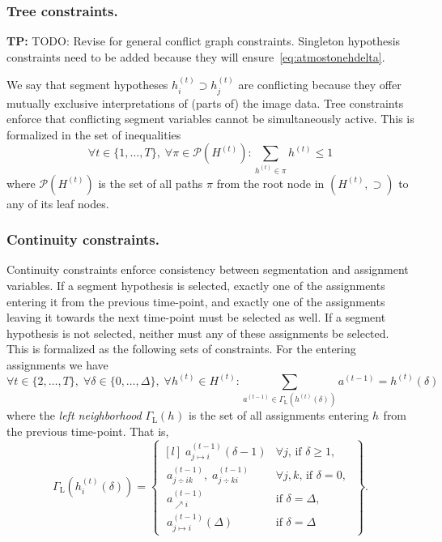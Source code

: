 \documentclass[a4paper]{article}
\newcommand{\TP}[1]{{\color{Red}\sc \textbf{TP:} #1}{}}
\newcommand{\set}[1]{\ensuremath{\{#1\}}}
\newcommand{\hypset}[1]{\ensuremath{H^{(#1)}}\xspace}
\newcommand{\Hypt}{\hypset{t}}
\newcommand{\hypti}[2][t]{\ensuremath{h^{(#1)}_{#2}}\xspace}
\newcommand{\vhset}[1]{\hypset{#1}}
\newcommand{\Ht}[1][t]{\vhset{#1}}
\newcommand{\vh}[1][]{\ensuremath{h_{#1}}\xspace}
\newcommand{\vht}[1][t]{\ensuremath{h^{(#1)}}\xspace}
\newcommand{\vhtd}[2][t]{\ensuremath{h^{(#1)}\left({#2}\right)}\xspace}
\newcommand{\vhtid}[3][t]{\ensuremath{h^{(#1)}_{#2}\left({#3}\right)}\xspace}
\newcommand{\Paths}[1]{\ensuremath{\mathcal{P}(#1)}\xspace}
\newcommand{\Path}{\ensuremath{\pi}\xspace}
\newcommand{\vat}[1][t]{\ensuremath{a^{(#1)}}\xspace}
\newcommand{\vamd}[4]{\ensuremath{a^{(#1)}_{#2\mapsto#3}\left(#4\right)}\xspace}
\newcommand{\vad}[3]{\ensuremath{a^{(#1)}_{#2\div#3}}\xspace}
\newcommand{\vaa}[2]{\ensuremath{a^{(#1)}_{\nearrow#2}}\xspace}
\newcommand{\Gl}[1]{\ensuremath{\Gamma_{\text{L}}\left(#1\right)}\xspace}
\begin{document}
\subsubsection{Tree constraints.}
%
%
\TP{TODO: Revise for general conflict graph constraints. Singleton hypothesis constraints need to be added because they will ensure~\eqref{eq:atmostonehdelta}.}

We say that segment hypotheses $\hypti{i} \supset \hypti{j}$ are conflicting because they offer mutually exclusive interpretations of (parts of) the image data.
Tree constraints enforce that conflicting segment variables cannot be simultaneously active.
This is formalized in the set of inequalities
\begin{equation}\label{eq:treeconstraints}
  \forall t \in \set{1, \dots, T},\;
  \forall \Path \in \Paths{\Ht}:
  \sum_{\vht \in \Path} \vht \leq 1
\end{equation}
where \Paths{\Ht} is the set of all paths \Path from the root node in $(\Hypt,\supset)$ to any of its leaf nodes.
%
%
\subsubsection{Continuity constraints.}
%
%
Continuity constraints enforce consistency between segmentation and assignment variables.
If a segment hypothesis is selected,
   exactly one of the assignments entering it from the previous time-point,
   and exactly one of the assignments leaving it towards the next time-point must be selected as well.
If a segment hypothesis is not selected, neither must any of these assignments be selected.
This is formalized as the following sets of constraints.
For the entering assignments we have
\begin{equation}\label{eq:contenter}
  \forall t \in \set{2, \dots, T},\;
  \forall \delta \in \set{0,\dots,\Delta},\;
  \forall \vht \in \Ht:
    \sum_{\vat[t-1] \in \Gl{\vhtd{\delta}}} \vat[t-1]
  = \vhtd{\delta}
\end{equation}
where the \emph{left neighborhood} \Gl{\vh} is the set of all assignments entering \vh from the previous time-point.
That is,
\begin{equation}
	\Gl{\vhtid{i}{\delta}}
	= \begin{Bmatrix*}[l]
			\; \vamd{t-1}{j}{i}{\delta-1}            & \forall j \text{, if } \delta \ge 1, \\[4mm]
			\; \vad{t-1}{j}{ik},\; \vad{t-1}{j}{ki}  & \forall j, k \text{, if } \delta = 0,\; \\[4mm]
			\; \vaa{t-1}{i}                          & \text{if } \delta = \Delta, \\[4mm]
			\; \vamd{t-1}{j}{i}{\Delta}              & \text{if } \delta = \Delta
		\end{Bmatrix*}.
\end{equation}
%
\end{document}
